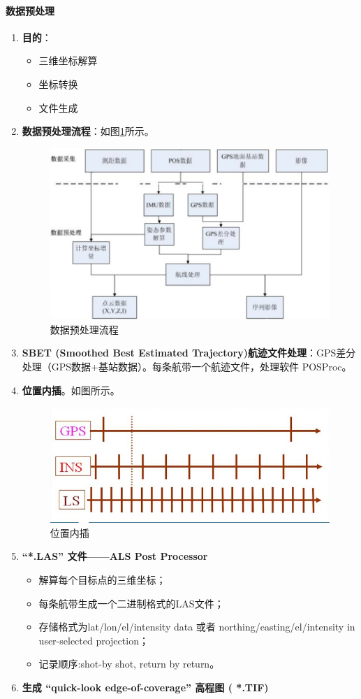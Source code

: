 \paragraph{数据预处理}
\begin{enumerate}
	\item \textbf{目的}：
		\begin{itemize}
			\item 三维坐标解算
			\item 坐标转换
			\item 文件生成
		\end{itemize}
	\item \textbf{数据预处理流程}：如图\ref{fig:数据预处理流程}所示。
		\begin{figure}[htbp]
			\centering
			\includegraphics[width=0.5\linewidth]{figure/Chapter5/数据预处理流程}
			\caption{数据预处理流程}
			\label{fig:数据预处理流程}
		\end{figure}
	\item \textbf{SBET (Smoothed Best Estimated Trajectory)航迹文件处理}：GPS差分处理（GPS数据+基站数据）。每条航带一个航迹文件，处理软件 POSProc。
	\item \textbf{位置内插}。如图所示。
		\begin{figure}[htbp]
			\centering
			\includegraphics[width=0.5\linewidth]{figure/Chapter5/位置内插}
			\caption{位置内插}
			\label{fig:位置内插}
		\end{figure}
	\item \textbf{“*.LAS” 文件——ALS Post Processor}
		\begin{itemize}
			\item 解算每个目标点的三维坐标；
			\item 每条航带生成一个二进制格式的LAS文件；
			\item 存储格式为lat/lon/el/intensity data 或者 northing/easting/el/intensity in user-selected projection；
			\item 记录顺序:shot-by shot, return by return。
		\end{itemize}
	\item \textbf{生成 “quick-look edge-of-coverage” 高程图 ( *.TIF)}
\end{enumerate}


